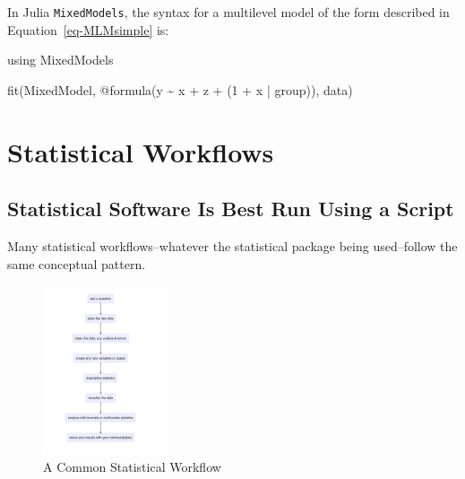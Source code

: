 \documentclass[
  letterpaper,
  DIV=11,
  numbers=noendperiod]{scrreprt}
\newenvironment{Shaded}{\begin{snugshade}}{\end{snugshade}}
\newcommand{\BuiltInTok}[1]{\textcolor[rgb]{0.00,0.23,0.31}{#1}}
\newcommand{\FloatTok}[1]{\textcolor[rgb]{0.68,0.00,0.00}{#1}}
\newcommand{\FunctionTok}[1]{\textcolor[rgb]{0.28,0.35,0.67}{#1}}
\newcommand{\ImportTok}[1]{\textcolor[rgb]{0.00,0.46,0.62}{#1}}
\newcommand{\NormalTok}[1]{\textcolor[rgb]{0.00,0.23,0.31}{#1}}
\newcommand{\OperatorTok}[1]{\textcolor[rgb]{0.37,0.37,0.37}{#1}}
\newcommand{\PreprocessorTok}[1]{\textcolor[rgb]{0.68,0.00,0.00}{#1}}
\begin{document}
In Julia \texttt{MixedModels}, the syntax for a multilevel model of the
form described in Equation~\ref{eq-MLMsimple} is:

\begin{Shaded}
\begin{Highlighting}[]
\ImportTok{using} \BuiltInTok{MixedModels}

\FunctionTok{fit}\NormalTok{(MixedModel, }\PreprocessorTok{@formula}\NormalTok{(y }\OperatorTok{\textasciitilde{}}\NormalTok{ x }\OperatorTok{+}\NormalTok{ z }\OperatorTok{+}\NormalTok{ (}\FloatTok{1} \OperatorTok{+}\NormalTok{ x }\OperatorTok{|}\NormalTok{ group)), data)}
\end{Highlighting}
\end{Shaded}


\chapter{Statistical Workflows}\label{statistical-workflows}

\section{Statistical Software Is Best Run Using a
Script}\label{statistical-software-is-best-run-using-a-script}

Many statistical workflows--whatever the statistical package being
used--follow the same conceptual pattern.

\begin{figure}[H]

{\centering \includegraphics[width=0.33\textwidth,height=\textheight]{workflow.png}

}

\caption{A Common Statistical Workflow}

\end{figure}%
\end{document}
